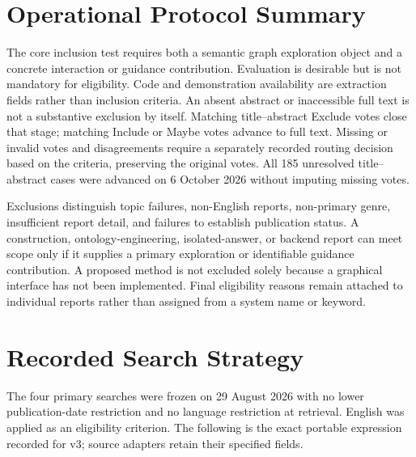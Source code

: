 \documentclass[manuscript,review,screen]{acmart}
\begin{document}
\appendix
\section{Operational Protocol Summary}\label{app:protocol}
The core inclusion test requires both a semantic graph exploration object and a concrete interaction or guidance contribution. Evaluation is desirable but is not mandatory for eligibility. Code and demonstration availability are extraction fields rather than inclusion criteria. An absent abstract or inaccessible full text is not a substantive exclusion by itself. Matching title--abstract Exclude votes close that stage; matching Include or Maybe votes advance to full text. Missing or invalid votes and disagreements require a separately recorded routing decision based on the criteria, preserving the original votes. All 185 unresolved title--abstract cases were advanced on 6 October 2026 without imputing missing votes.

Exclusions distinguish topic failures, non-English reports, non-primary genre, insufficient report detail, and failures to establish publication status. A construction, ontology-engineering, isolated-answer, or backend report can meet scope only if it supplies a primary exploration or identifiable guidance contribution. A proposed method is not excluded solely because a graphical interface has not been implemented. Final eligibility reasons remain attached to individual reports rather than assigned from a system name or keyword.

\section{Recorded Search Strategy}\label{app:search}
The four primary searches were frozen on 29 August 2026 with no lower publication-date restriction and no language restriction at retrieval. English was applied as an eligibility criterion. The following is the exact portable expression recorded for v3; source adapters retain their specified fields.
\end{document}

